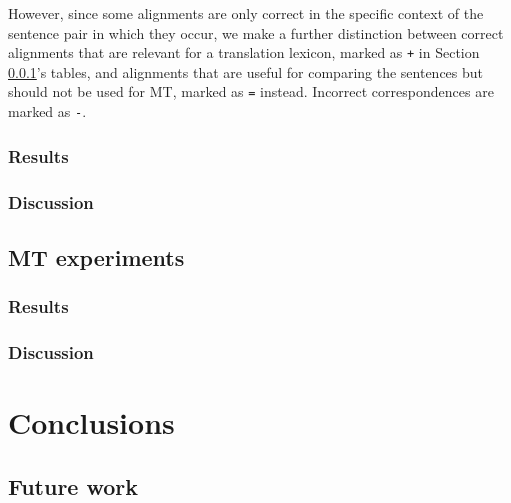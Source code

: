 \documentclass[11pt]{article}
\begin{document}
However, since some alignments are only correct in the specific context of the sentence pair in which they occur, we make a further distinction between correct alignments that are relevant for a translation lexicon, marked as \texttt{+} in Section \ref{ceres}'s tables, and alignments that are useful for comparing the sentences but should not be used for MT, marked as \texttt{=} instead. %
Incorrect correspondences are marked as \texttt{-}. 


\subsubsection{Results} \label{ceres}
\subsubsection{Discussion}

\subsection{MT experiments}
\subsubsection{Results}
\subsubsection{Discussion}

\section{Conclusions} \label{conclusions}
\subsection{Future work}

%
%
\end{document}
